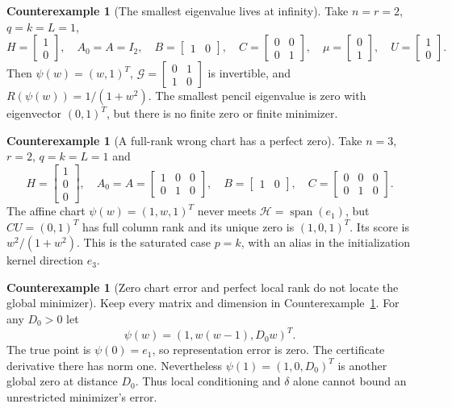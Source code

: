 \documentclass[11pt,a4paper]{article}
\theoremstyle{definition}
\theoremstyle{definition}
\newtheorem{example}[theorem]{Counterexample}
\theoremstyle{remark}\newtheorem{remark}[theorem]{Remark}
\newcommand{\HH}{\mathcal H}\newcommand{\XX}{\mathcal X}\newcommand{\col}{\operatorname{col}}
\begin{document}
\begin{example}[The smallest eigenvalue lives at infinity]\label{ex:infinity}
Take $n=r=2$, $q=k=L=1$,
\[
H=\begin{bmatrix}1\\0\end{bmatrix},\quad A_0=A=I_2,\quad
B=\begin{bmatrix}1&0\end{bmatrix},\quad
C=\begin{bmatrix}0&0\\0&1\end{bmatrix},\quad
\mu=\begin{bmatrix}0\\1\end{bmatrix},\quad U=\begin{bmatrix}1\\0\end{bmatrix}.
\]
Then $\psi(w)=(w,1)^T$, $\mathcal G=\begin{bmatrix}0&1\\1&0\end{bmatrix}$ is invertible, and $R(\psi(w))=1/(1+w^2)$. The smallest pencil eigenvalue is zero with eigenvector $(0,1)^T$, but there is no finite zero or finite minimizer.
\end{example}

\begin{example}[A full-rank wrong chart has a perfect zero]\label{ex:wrongzero}
Take $n=3$, $r=2$, $q=k=L=1$ and
\[
H=\begin{bmatrix}1\\0\\0\end{bmatrix},\quad
A_0=A=\begin{bmatrix}1&0&0\\0&1&0\end{bmatrix},\quad
B=\begin{bmatrix}1&0\end{bmatrix},\quad
C=\begin{bmatrix}0&0&0\\0&1&0\end{bmatrix}.
\]
The affine chart $\psi(w)=(1,w,1)^T$ never meets $\HH=\operatorname{span}(e_1)$, but $CU=(0,1)^T$ has full column rank and its unique zero is $(1,0,1)^T$. Its score is $w^2/(1+w^2)$. This is the saturated case $p=k$, with an alias in the initialization kernel direction $e_3$.
\end{example}

\begin{example}[Zero chart error and perfect local rank do not locate the global minimizer]\label{ex:remote}
Keep every matrix and dimension in Counterexample~\ref{ex:wrongzero}. For any $D_0>0$ let
\[
\psi(w)=(1,w(w-1),D_0w)^T.
\]
The true point is $\psi(0)=e_1$, so representation error is zero. The certificate derivative there has norm one. Nevertheless $\psi(1)=(1,0,D_0)^T$ is another global zero at distance $D_0$. Thus local conditioning and $\delta$ alone cannot bound an unrestricted minimizer's error.
\end{example}
\end{document}
